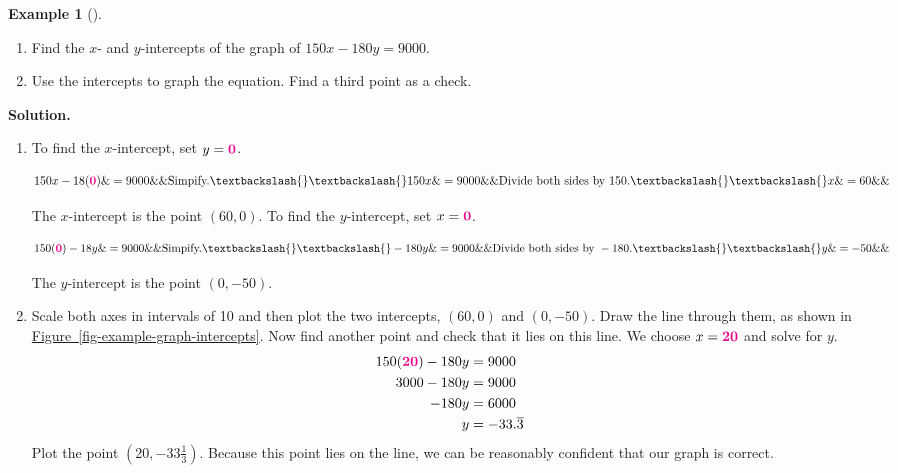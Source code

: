 \documentclass[10pt,]{book}
\theoremstyle{plain}
\theoremstyle{definition}
\theoremstyle{definition}
\newtheorem{example}[theorem]{Example}
\theoremstyle{definition}
\theoremstyle{definition}
\numberwithin{equation}{part}
\newcommand{\alert}[1]{\boldsymbol{\color{magenta}{#1}}}
\newcommand{\amp}{&}
\begin{document}
\begin{example}[]\label{intercepts}
\leavevmode%
\begin{enumerate}[label=\alph*]
\item\hypertarget{li-72}{}Find the \(x\)- and \(y\)-intercepts of the graph of \(150x - 180y = 9000\).%
\item\hypertarget{li-73}{}Use the intercepts to graph the equation. Find a third point as a check.%
\end{enumerate}
\par\medskip\noindent%
\textbf{Solution.}\quad \leavevmode%
\begin{enumerate}[label=\alph*]
\item\hypertarget{li-74}{}To find the \(x\)-intercept, set \(y = \alert{0}\).%
\par
\begin{align*} 150x-18(\alert{0})\&=9000 \&\&\text{Simpify.}\textbackslash{}\textbackslash{} 150x\&=9000  \&\&\text{Divide both sides by 150.}\textbackslash{}\textbackslash{} x\&=60   \&\& \end{align*}%
\par
The \(x\)-intercept is the point \((60, 0)\). To find the \(y\)-intercept, set \(x = \alert{0}\).%
\par
\begin{align*} 150(\alert{0})-18y\&=9000 \&\&\text{Simpify.}\textbackslash{}\textbackslash{} -180y\&=9000  \&\&\text{Divide both sides by } -180\text{.}\textbackslash{}\textbackslash{} y\&=-50   \&\& \end{align*}%
\par
The \(y\)-intercept is the point \((0, -50)\).%
\item\hypertarget{li-75}{}Scale both axes in intervals of 10 and then plot the two intercepts, \((60, 0)\) and \((0, -50)\). Draw the line through them, as shown in \hyperref[fig-example-graph-intercepts]{Figure~\ref{fig-example-graph-intercepts}}. Now find another point and check that it lies on this line. We choose \(x = \alert{20}\) and solve for \(y\).%
\begin{align*}
150(\alert{20}) -180y \amp = 9000\\
3000 -180y \amp = 9000\\
-180y \amp = 6000\\
y \amp =-33.\overline{3}
\end{align*}
Plot the point \((20, -33\frac{1}{3})\). Because this point lies on the line, we can be reasonably confident that our graph is correct. \begin{figure}

\end{figure}
\end{enumerate}
\end{example}
\end{document}
